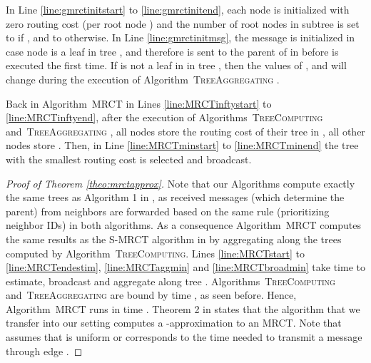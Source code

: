 \documentclass[11pt]{article}
\newif\iffull
\begin{document}
In  Line \ref{line:gmrctinitstart} to \ref{line:gmrctinitend}, each node  is initialized with zero routing cost  (per root node ) and  the number of root nodes  in subtree  is set to  if , and to  otherwise. In Line \ref{line:gmrctinitmsg}, the message  is initialized in case node  is a leaf in tree , and therefore is sent to the parent of  in  before  is executed the first time. If  is not a leaf in in tree , then the values of ,  and  will change during the execution of Algorithm\iffull~\ref{alg:TreeAggregating}\fi~\textsc{TreeAggregating} .

Back in Algorithm\iffull~\ref{alg:MRCT}\fi~\textsc{MRCT}  in Lines \ref{line:MRCTinftystart} to \ref{line:MRCTinftyend}, after the execution of Algorithms\iffull~\ref{alg:TreeComputing}\fi~\textsc{TreeComputing}  and\iffull~\ref{alg:TreeAggregating}\fi~\textsc{TreeAggregating} , all nodes  store the routing cost  of their tree  in , all other nodes  store . Then, in Line \ref{line:MRCTminstart} to \ref{line:MRCTminend} the tree with the smallest routing cost is selected and broadcast.



\begin{proof}[Proof of Theorem \ref{theo:mrctapprox}]
Note that our Algorithms compute exactly the same trees as Algorithm 1 in \cite{hochuli:holzer:MRCST}, as received messages (which determine the parent) from neighbors are forwarded based on the same rule (prioritizing neighbor IDs) in both algorithms.
As a consequence Algorithm\iffull~\ref{alg:MRCT}\fi~\textsc{MRCT}  computes the same results as the S-MRCT algorithm in \cite{hochuli:holzer:MRCST} by aggregating along the trees computed by Algorithm\iffull~\ref{alg:TreeComputing}\fi~\textsc{TreeComputing}. Lines \ref{line:MRCTstart} to \ref{line:MRCTendestim}, \ref{line:MRCTaggmin} and \ref{line:MRCTbroadmin} take time  to estimate, broadcast and aggregate along tree . Algorithms\iffull~\ref{alg:TreeComputing}\fi~\textsc{TreeComputing}  and\iffull~\ref{alg:TreeAggregating}\fi~\textsc{TreeAggregating}  are bound by time , as seen before. Hence, Algorithm\iffull~\ref{alg:MRCT}\fi~\textsc{MRCT}  runs in time . Theorem 2 in \cite{hochuli:holzer:MRCST} states that the algorithm that we transfer into our setting computes a -approximation to an MRCT. Note that \cite{hochuli:holzer:MRCST} assumes that  is uniform or corresponds to the time needed to transmit a message through edge .
\end{proof}
\end{document}
